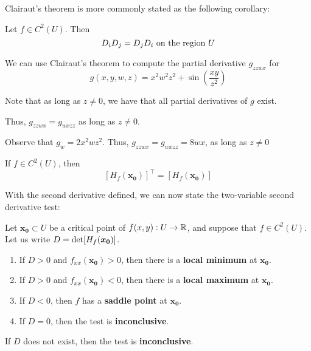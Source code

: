     Clairaut's theorem is more commonly stated as the following corollary:
    \begin{corollary}
       Let $f \in C^2(U)$.  Then  $$D_iD_j = D_jD_i\ \textnormal{on the region} \ U$$
    \end{corollary}

\begin{example}
    We can use Clairaut's theorem to compute the partial derivative $g_{zzwx}$ for $$g(x,y,w,z) = x^2w^2z^2 + \sin\left(\frac{xy}{z^2}\right)$$

    Note that as long as $z \neq 0$, we have that all partial derivatives of $g$ exist.

    Thus, $g_{zzwx} = g_{wxzz}$ as long as $z \neq 0$.  
    
    Observe that $g_w = 2x^2wz^2$.  Thus, $g_{zzwx} = g_{wxzz} = 8wx$, as long as $z\neq 0$
\end{example}

\begin{corollary}
    If $f \in C^2(U)$, then $$\left[H_f(\bm{x_0})\right]^\intercal = \left[H_f(\bm{x_0})\right]$$
\end{corollary}

With the second derivative defined, we can now state the two-variable second derivative test:

\begin{theorem}

Let $\bm{x_0} \subset U$ be a critical point of $f(x,y) : U \to \mathbb{R}$, and suppose that $f \in C^2(U)$.  Let us write $D = \textnormal{det}[H_f(\bm{x_0})]$.

\begin{enumerate}
    \item If $D > 0$ and $f_{xx}(\bm{x_0}) > 0$, then there is a \textbf{local minimum} at $\bm{x_0}$.
    \item If $D > 0$ and $f_{xx}(\bm{x_0}) < 0$, then there is a \textbf{local maximum} at $\bm{x_0}$. 
    \item If $D < 0$, then $f$ has a \textbf{saddle point} at $\bm{x_0}$. 
    \item If $D = 0$, then the test is \textbf{inconclusive}. 
\end{enumerate}

If $D$ does not exist, then the test is \textbf{inconclusive}.
\end{theorem}

